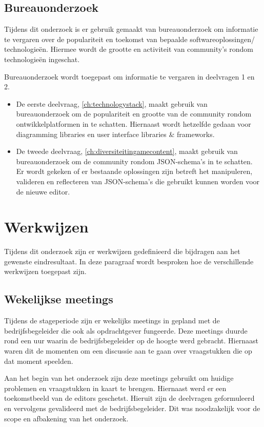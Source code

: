 \subsection{Bureauonderzoek}
Tijdens dit onderzoek is er gebruik gemaakt van bureauonderzoek om informatie te vergaren over de populariteit en toekomst van bepaalde softwareoplossingen/ technologieën. Hiermee wordt de grootte en activiteit van community’s rondom technologieën ingeschat.

Bureauonderzoek wordt toegepast om informatie te vergaren in deelvragen 1 en 2.
\begin{itemize}
    \item De eerste deelvraag, \autoref{ch:technologystack}, maakt gebruik van bureauonderzoek om de populariteit en grootte van de community rondom ontwikkelplatformen in te schatten. Hiernaast wordt hetzelfde gedaan voor diagramming libraries en user interface libraries \& frameworks. 
    \item De tweede deelvraag, \autoref{ch:diversiteitingamecontent}, maakt gebruik van bureauonderzoek om de community rondom JSON-schema’s in te schatten. Er wordt gekeken of er bestaande oplossingen zijn betreft het manipuleren, valideren en reflecteren van JSON-schema’s die gebruikt kunnen worden voor de nieuwe editor.
\end{itemize}

\pagebreak
\section{Werkwijzen}
Tijdens dit onderzoek zijn er werkwijzen gedefinieerd die bijdragen aan het gewenste eindresultaat. In deze paragraaf wordt besproken hoe de verschillende werkwijzen toegepast zijn.

\subsection{Wekelijkse meetings}
Tijdens de stageperiode zijn er wekelijks meetings in gepland met de bedrijfsbegeleider die ook als opdrachtgever fungeerde. Deze meetings duurde rond een uur waarin de bedrijfsbegeleider op de hoogte werd gebracht. Hiernaast waren dit de momenten om een discussie aan te gaan over vraagstukken die op dat moment speelden.

Aan het begin van het onderzoek zijn deze meetings gebruikt om huidige problemen en vraagstukken in kaart te brengen. Hiernaast werd er een toekomstbeeld van de editors geschetst. Hieruit zijn de deelvragen geformuleerd en vervolgens gevalideerd met de bedrijfsbegeleider. Dit was noodzakelijk voor de scope en afbakening van het onderzoek.

